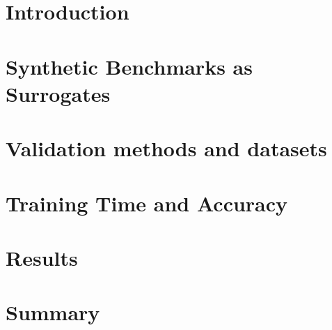 \section{Introduction}

\section{Synthetic Benchmarks as Surrogates}


\section{Validation methods and datasets}

\section{Training Time and Accuracy}

\section{Results}

\section{Summary}
